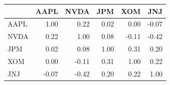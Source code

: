 \begin{tabular}{lrrrrr}
\toprule
 & AAPL & NVDA & JPM & XOM & JNJ \\
\midrule
AAPL & 1.00 & 0.22 & 0.02 & 0.00 & -0.07 \\
NVDA & 0.22 & 1.00 & 0.08 & -0.11 & -0.42 \\
JPM & 0.02 & 0.08 & 1.00 & 0.31 & 0.20 \\
XOM & 0.00 & -0.11 & 0.31 & 1.00 & 0.22 \\
JNJ & -0.07 & -0.42 & 0.20 & 0.22 & 1.00 \\
\bottomrule
\end{tabular}
